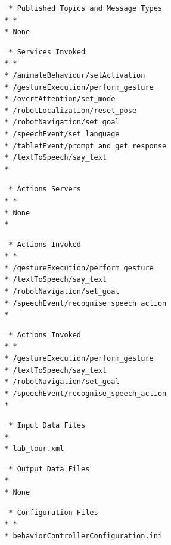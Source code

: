 \documentclass{CSSRforAfrica}
\newcommand{\checkboxChecked}{\fbox{\ding{51}}} %
\begin{document}
\begin{description}
\item[\checkboxChecked] 
 {\small 
\begin{verbatim}                    
  * Published Topics and Message Types
 * *
 * None
\end{verbatim}}

\item[\checkboxChecked] 
 {\small 
\begin{verbatim}                    
  * Services Invoked
 * *
 * /animateBehaviour/setActivation
 * /gestureExecution/perform_gesture
 * /overtAttention/set_mode
 * /robotLocalization/reset_pose
 * /robotNavigation/set_goal
 * /speechEvent/set_language
 * /tabletEvent/prompt_and_get_response
 * /textToSpeech/say_text
 *
\end{verbatim}}

\item[\checkboxChecked] 
 {\small 
\begin{verbatim}                    
  * Actions Servers
 * *
 * None
 * 
\end{verbatim}}

\item[\checkboxChecked] 
 {\small 
\begin{verbatim}                    
  * Actions Invoked
 * *
 * /gestureExecution/perform_gesture
 * /textToSpeech/say_text
 * /robotNavigation/set_goal
 * /speechEvent/recognise_speech_action
 *
\end{verbatim}}


\item[\checkboxChecked] 
 {\small 
\begin{verbatim}                    
  * Actions Invoked
 * *
 * /gestureExecution/perform_gesture
 * /textToSpeech/say_text
 * /robotNavigation/set_goal
 * /speechEvent/recognise_speech_action
 *
\end{verbatim}}

\item[\checkboxChecked] 
 {\small 
\begin{verbatim}
  * Input Data Files
 *
 * lab_tour.xml
\end{verbatim}}

\item[\checkboxChecked] 
 {\small 
\begin{verbatim}
  * Output Data Files
 *
 * None
\end{verbatim}}

\item[\checkboxChecked] 
 {\small 
\begin{verbatim}
  * Configuration Files
 * *
 * behaviorControllerConfiguration.ini
\end{verbatim}}


\end{description}
\end{document}

